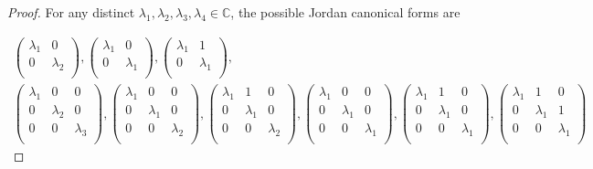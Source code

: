 \documentclass{article}
\begin{document}
  \begin{proof}
    For any distinct
    $\lambda_1,\lambda_2,\lambda_3,\lambda_4\in\mathbb{C}$, the possible
    Jordan canonical forms are

    \begin{align*}
      \begin{pmatrix} \lambda_1&0\\ 0&\lambda_2\\ \end{pmatrix},
        \begin{pmatrix} \lambda_1&0\\ 0&\lambda_1\\ \end{pmatrix},
        \begin{pmatrix} \lambda_1&1\\ 0&\lambda_1\\ \end{pmatrix},\\
      \begin{pmatrix} \lambda_1&0&0\\ 0&\lambda_2&0\\ 0&0&\lambda_3\\
        \end{pmatrix},
        \begin{pmatrix} \lambda_1&0&0\\ 0&\lambda_1&0\\ 0&0&\lambda_2\\
        \end{pmatrix},
        \begin{pmatrix} \lambda_1&1&0\\ 0&\lambda_1&0\\ 0&0&\lambda_2\\
        \end{pmatrix},
        \begin{pmatrix} \lambda_1&0&0\\ 0&\lambda_1&0\\ 0&0&\lambda_1\\
        \end{pmatrix},
        \begin{pmatrix} \lambda_1&1&0\\ 0&\lambda_1&0\\ 0&0&\lambda_1\\
        \end{pmatrix},
        \begin{pmatrix} \lambda_1&1&0\\ 0&\lambda_1&1\\ 0&0&\lambda_1\\

\end{pmatrix}
\end{align*}
\end{proof}
\end{document}

